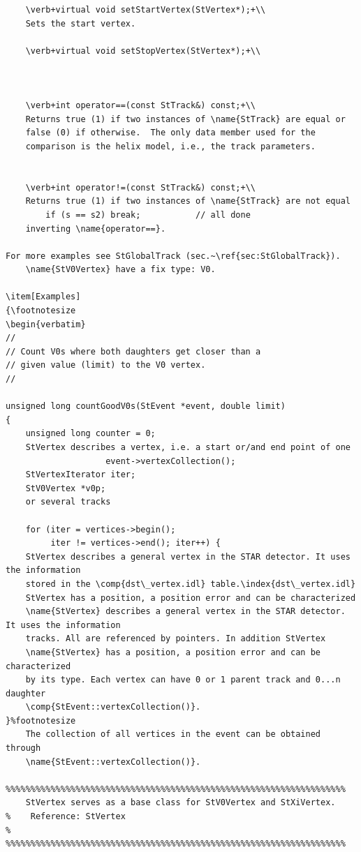 \begin{Entry}
\begin{Entry}
{\begin{verbatim}
    \verb+virtual void setStartVertex(StVertex*);+\\
    Sets the start vertex.

    \verb+virtual void setStopVertex(StVertex*);+\\
    
    
    
    \verb+int operator==(const StTrack&) const;+\\
    Returns true (1) if two instances of \name{StTrack} are equal or
    false (0) if otherwise.  The only data member used for the
    comparison is the helix model, i.e., the track parameters.
    

    \verb+int operator!=(const StTrack&) const;+\\
    Returns true (1) if two instances of \name{StTrack} are not equal
        if (s == s2) break;           // all done     
    inverting \name{operator==}.

For more examples see StGlobalTrack (sec.~\ref{sec:StGlobalTrack}).
    \name{StV0Vertex} have a fix type: V0.

\item[Examples]
{\footnotesize
\begin{verbatim}
//
// Count V0s where both daughters get closer than a
// given value (limit) to the V0 vertex.
//

unsigned long countGoodV0s(StEvent *event, double limit)
{
    unsigned long counter = 0;
    StVertex describes a vertex, i.e. a start or/and end point of one
                    event->vertexCollection();
    StVertexIterator iter;
    StV0Vertex *v0p;
    or several tracks 
    
    for (iter = vertices->begin();
         iter != vertices->end(); iter++) {
    StVertex describes a general vertex in the STAR detector. It uses the information
    stored in the \comp{dst\_vertex.idl} table.\index{dst\_vertex.idl}
    StVertex has a position, a position error and can be characterized
    \name{StVertex} describes a general vertex in the STAR detector. It uses the information
    tracks. All are referenced by pointers. In addition StVertex
    \name{StVertex} has a position, a position error and can be characterized
    by its type. Each vertex can have 0 or 1 parent track and 0...n daughter
    \comp{StEvent::vertexCollection()}.
}%footnotesize
    The collection of all vertices in the event can be obtained through
    \name{StEvent::vertexCollection()}.
    
%%%%%%%%%%%%%%%%%%%%%%%%%%%%%%%%%%%%%%%%%%%%%%%%%%%%%%%%%%%%%%%%%%%%
    StVertex serves as a base class for StV0Vertex and StXiVertex.
%    Reference: StVertex
%
%%%%%%%%%%%%%%%%%%%%%%%%%%%%%%%%%%%%%%%%%%%%%%%%%%%%%%%%%%%%%%%%%%%%

\end{verbatim}}
\end{Entry}
\end{Entry}
